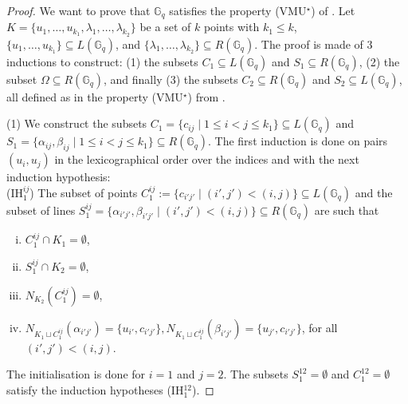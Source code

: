 \documentclass[10pt,a4paper]{article}
\newcommand{\ls}{\leqslant}
\newcommand{\G}[1][q]{\mathbb{G}_{#1}}
\begin{document}
    \begin{proof}
        We want to prove that $\G$ satisfies the property (VMU$^\star$) of . Let $K= \{u_1, \ldots, u_{k_1}, \lambda_1, \ldots, \lambda_{k_2}\}$ be a set of $k$ points with $k_1\ls k$, $\{u_1, \ldots, u_{k_1}\} \subseteq L(\G)$, and $\{\lambda_1, \ldots, \lambda_{k_2}\} \subseteq R(\G)$. The proof is made of 3 inductions to construct: (1) the subsets $C_1 \subseteq L(\G)$ and $S_1\subseteq R(\G) $, (2) the subset $\Omega \subseteq R(\G)$, and finally (3) the subsets $C_2 \subseteq R(\G)$ and $S_2\subseteq L(\G)$, all defined as in the property (VMU$^\star$) from .

        (1) We construct the subsets $C_1 = \{c_{ij}\mid 1 \ls i<j \ls k_1\} \subseteq L(\G)$ and $S_1 = \{\alpha_{ij}, \beta_{ij} \mid 1 \ls i<j \ls k_1 \}\subseteq R(\G)$. The first induction is done on pairs $(u_i, u_j)$ in the lexicographical order over the indices and with the next induction hypothesis:\\

        (IH$_1^{ij}$) The subset of points $C_1^{ij} := \{c_{i'j'}\mid (i',j')<(i, j)\} \subseteq L(\G)$ and the subset of lines $S_1^{ij} = \{\alpha_{i'j'}, \beta_{i'j'}\mid (i', j') < (i,j) \}\subseteq R(\G)$ are such that
        \begin{enumerate}[(i)]
            \item $C_1^{ij} \cap K_1 = \emptyset$,
            \item $S_1^{ij} \cap K_2 = \emptyset$,
            \item $N_{K_2}(C_1^{ij})= \emptyset$,
            \item $N_{K_1 \sqcup C_1^{ij}}(\alpha_{i'j'}) = \{u_{i'}, c_{i'j'}\}, N_{K_1 \sqcup C_1^{ij}}(\beta_{i'j'}) = \{u_{j'}, c_{i'j'}\}$, for all $(i', j')<(i,j)$.
        \end{enumerate}

        The initialisation is done for $i=1$ and $j=2$. The subsets $S_1^{12} = \emptyset$ and $C_1^{12}=\emptyset$ satisfy the induction hypotheses (IH$_1^{12}$). 
        

\end{proof}
\end{document}
